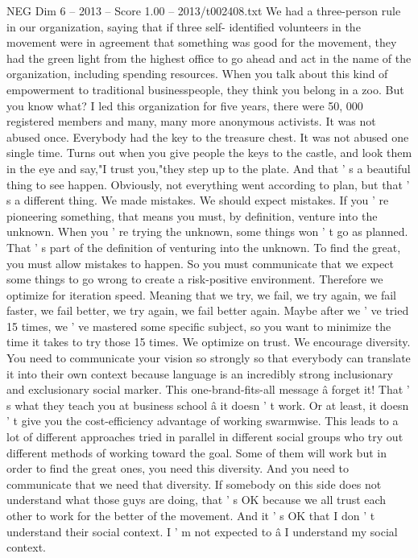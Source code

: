 \begin{textsample}{NEG Dim 6 – 2013 – Score 1.00 – 2013/t002408.txt}
We had a three-person rule in our organization, saying that if three self- identified volunteers in the movement were in agreement that something was good for the movement, they had the green light from the highest office to go ahead and act in the name of the organization, including spending resources.
When you talk about this kind of empowerment to traditional businesspeople, they think you belong in a zoo.
But you know what?
I led this organization for five years, there were 50, 000 registered members and many, many more anonymous activists.
It was not abused once.
Everybody had the key to the treasure chest.
It was not abused one single time.
Turns out when you give people the keys to the castle, and look them in the eye and say,"I trust you,"they step up to the plate.
And that ' s a beautiful thing to see happen.
Obviously, not everything went according to plan, but that ' s a different thing.
We made mistakes.
We should expect mistakes.
If you ' re pioneering something, that means you must, by definition, venture into the unknown.
When you ' re trying the unknown, some things won ' t go as planned.
That ' s part of the definition of venturing into the unknown.
To find the great, you must allow mistakes to happen.
So you must communicate that we expect some things to go wrong to create a risk-positive environment.
Therefore we optimize for iteration speed.
Meaning that we try, we fail, we try again, we fail faster, we fail better, we try again, we fail better again.
Maybe after we ' ve tried 15 times, we ' ve mastered some specific subject, so you want to minimize the time it takes to try those 15 times.
We optimize on trust.
We encourage diversity.
You need to communicate your vision so strongly so that everybody can translate it into their own context because language is an incredibly strong inclusionary and exclusionary social marker.
This one-brand-fits-all message â forget it!
That ' s what they teach you at business school â it doesn ' t work.
Or at least, it doesn ' t give you the cost-efficiency advantage of working swarmwise.
This leads to a lot of different approaches tried in parallel in different social groups who try out different methods of working toward the goal.
Some of them will work but in order to find the great ones, you need this diversity.
And you need to communicate that we need that diversity.
If somebody on this side does not understand what those guys are doing, that ' s OK because we all trust each other to work for the better of the movement.
And it ' s OK that I don ' t understand their social context.
I ' m not expected to â I understand my social context.

\end{textsample}

